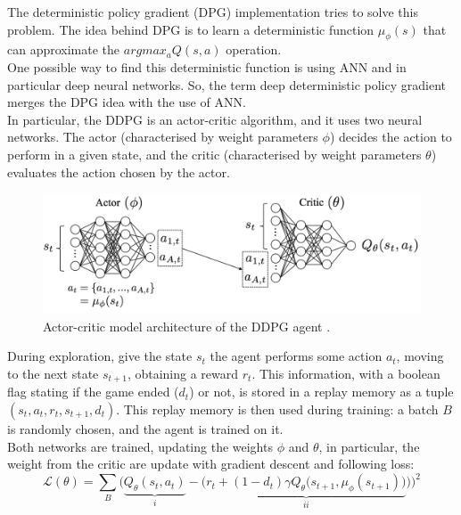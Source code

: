 The deterministic policy gradient (\gls{DPG}) implementation tries to solve this problem. The idea behind \gls{DPG} is to learn a deterministic function $\mu_{\phi}(s)$ that can approximate the $argmax_a Q(s,a)$ operation.\\
One possible way to find this deterministic function is using \gls{ANN} and in particular deep neural networks. So, the term deep deterministic policy gradient merges the \gls{DPG} idea with the use of \gls{ANN}. \\

In particular, the \gls{DDPG} is an actor-critic algorithm, and it uses two neural networks. The actor (characterised by weight parameters $\phi$) decides the action to perform in a given state, and the critic (characterised by weight parameters $\theta$) evaluates the action chosen by the actor.

\begin{figure}[H]
\centering
    \includegraphics[width=1\linewidth]{images/Background/RL/DDPG archi.PNG}
\caption[DDPG architecture]{Actor-critic model architecture of the \gls{DDPG} agent \cite{DDPGvc}.}
\end{figure}

\noindent During exploration, give the state $s_t$ the agent performs some action $a_t$, moving to the next state $s_{t+1}$, obtaining a reward $r_t$. This information, with a boolean flag stating if the game ended ($d_t$) or not, is stored in a replay memory as a tuple $(s_t,a_t,r_t,s_{t+1},d_t)$. This replay memory is then used during training: a batch $B$ is randomly chosen, and the agent is trained on it.\\ %
Both networks are trained, updating the weights $\phi$ and $\theta$, in particular, the weight from the critic are update with gradient descent and following loss:
\begin{equation} \label{eq:losscritic}
    \mathcal{L}(\theta) = \sum_B \Bigg( \underbrace{Q_{\theta}(s_t,a_t)}_{i} - \Big( \underbrace{r_t + (1-d_t)\gamma Q_{\theta}\big(s_{t+1}, \mu_{\phi}(s_{t+1})\big) }_{ii} \Big) \Bigg)^2
\end{equation}

